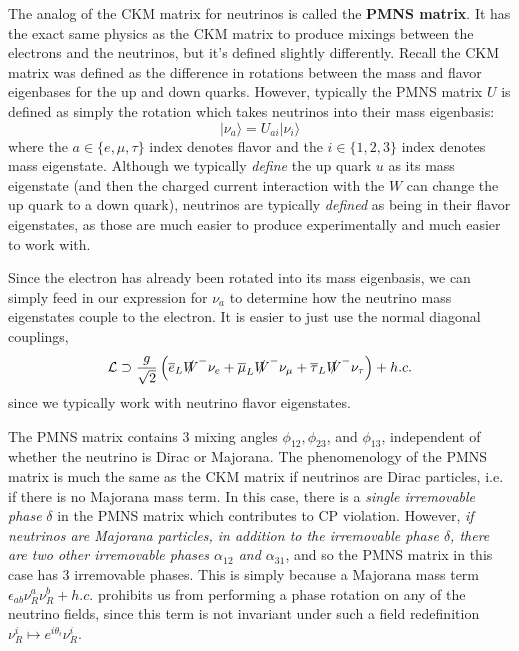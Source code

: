 \documentclass[11pt, oneside]{article}   	%
\theoremstyle{definition}
\numberwithin{equation}{subsection}		%
\begin{document}
The analog of the CKM matrix for neutrinos is called the \textbf{PMNS matrix}. It has the exact same physics as the CKM matrix to 
produce mixings between the electrons and the neutrinos, but it's defined slightly differently. Recall the CKM matrix was defined as the difference 
in rotations between the mass and flavor eigenbases for the up and down quarks. However, typically the PMNS matrix $U$ is defined as simply the 
rotation which takes neutrinos into their mass eigenbasis:
\begin{equation}
	|\nu_a\rangle = U_{ai} |\nu_i\rangle
\end{equation}
where the $a\in\{e, \mu, \tau\}$ index denotes flavor and the $i\in \{1, 2, 3\}$ index denotes mass eigenstate. Although we typically \textit{define} 
the up quark $u$ as its mass eigenstate (and then the charged current interaction with the $W$ can change the up quark to a down quark), 
neutrinos are typically \textit{defined} as being in their flavor eigenstates, as those are much easier to produce experimentally and much easier 
to work with. 

Since the electron has already been rotated into its mass eigenbasis, we can simply feed in our expression for $\nu_a$ to determine how 
the neutrino mass eigenstates couple to the electron. It is easier to just use the normal diagonal couplings, 
\begin{equation}
	\mathcal L	\supset \frac{g}{\sqrt 2} \left(\overline e_L \slashed W^- \nu_e + \overline \mu_L \slashed W^- \nu_\mu + \overline\tau_L \slashed W^- \nu_\tau\right) + h.c.
\end{equation}
since we typically work with neutrino flavor eigenstates. 

The PMNS matrix contains 3 mixing angles $\phi_{12}, \phi_{23}$, and $\phi_{13}$, independent of whether the neutrino is Dirac or Majorana. 
The phenomenology of the PMNS matrix is much the same as the CKM matrix if neutrinos are Dirac particles, i.e. if there is no 
Majorana mass term. In this case, there is a \textit{single irremovable phase} $\delta$ in the PMNS matrix which contributes to CP violation. 
However, \textit{if neutrinos are Majorana particles, in addition to the irremovable phase $\delta$, there are two other irremovable phases 
$\alpha_{12}$ and $\alpha_{31}$}, and so the PMNS matrix in this case has 3 irremovable phases. This is simply because a Majorana 
mass term $\epsilon_{ab}\nu_R^a \nu_R^b + h.c.$ prohibits us from performing a phase rotation on any of the neutrino fields, since 
this term is not invariant under such a field redefinition $\nu_R^i\mapsto e^{i\theta_i} \nu_R^i$.
\end{document}
